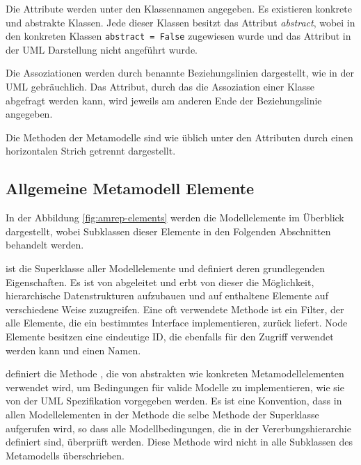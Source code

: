 Die Attribute werden unter den Klassennamen angegeben. Es existieren konkrete und abstrakte Klassen. Jede dieser Klassen besitzt das Attribut \emph{abstract}, wobei in den konkreten Klassen \texttt{abstract = False} zugewiesen wurde und das Attribut in der UML Darstellung nicht angeführt wurde.

Die Assoziationen werden durch benannte Beziehungslinien dargestellt, wie in der UML gebräuchlich. Das Attribut, durch das die Assoziation einer Klasse abgefragt werden kann, wird jeweils am anderen Ende der Beziehungslinie angegeben.

Die Methoden der Metamodelle sind wie üblich unter den Attributen durch einen horizontalen Strich getrennt dargestellt.


\subsection{Allgemeine Metamodell Elemente}

In der Abbildung \ref{fig:amrep-elements} werden die Modellelemente im Überblick dargestellt, wobei Subklassen dieser Elemente in den Folgenden Abschnitten behandelt werden.

 ist die Superklasse aller Modellelemente und definiert deren grundlegenden Eigenschaften. Es ist von  abgeleitet und erbt von dieser die Möglichkeit, hierarchische Datenstrukturen aufzubauen und auf enthaltene Elemente auf verschiedene Weise zuzugreifen. Eine oft verwendete Methode ist ein Filter, der alle Elemente, die ein bestimmtes Interface implementieren, zurück liefert. Node Elemente besitzen eine eindeutige ID, die ebenfalls für den Zugriff verwendet werden kann und einen Namen.

 definiert die Methode , die von abstrakten wie konkreten Metamodellelementen verwendet wird, um Bedingungen für valide Modelle zu implementieren, wie sie von der UML Spezifikation vorgegeben werden. Es ist eine Konvention, dass in allen Modellelementen in der Methode  die selbe Methode der Superklasse aufgerufen wird, so dass alle Modellbedingungen, die in der Vererbungshierarchie definiert sind, überprüft werden. Diese Methode wird nicht in alle Subklassen des Metamodells überschrieben.


